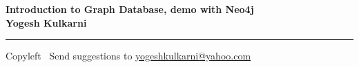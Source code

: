 
\graphicspath{{images/}}

\footnotesize


\begin{center}
\Large{\textbf{Introduction to Graph Database, demo with Neo4j\\ Yogesh Kulkarni}}  
\end{center}

\begin{multicols}{2}

\end{multicols}

\rule{\linewidth}{0.25pt}
\scriptsize
Copyleft \textcopyleft\  Send suggestions to 
\href{http://www.yogeshkulkarni.com}{yogeshkulkarni@yahoo.com}


